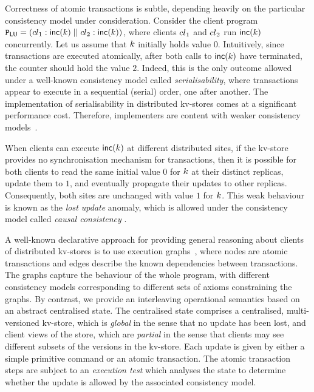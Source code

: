 Correctness of atomic transactions is subtle, depending heavily on the
particular consistency model under consideration.  
Consider the client program
$\mathtt{P}_{\mathsf{LU}} = \left({cl}_1 : \mathsf{inc}(k) \;|| \; {cl}_2:
  \mathsf{inc}(k) \right)$, where clients ${cl}_1$ and ${cl}_2$ run
$\mathsf{inc}(k)$ concurrently.
%
Let us assume that  $k$ initially holds value $0$.
Intuitively, since transactions are executed atomically, after both
calls to $\mathsf{inc}(k)$ have terminated, the counter should hold 
the value $2$.
Indeed, this is the only outcome allowed under 
a well-known
consistency model called  \emph{serialisability}, where transactions
appear to execute in a sequential (serial) order, one after another.
The implementation of  serialisability in distributed kv-stores comes at a
significant performance cost. Therefore, implementers are content with
{weaker} consistency models~\cite{whatdoyouwanttocitehere}. 

When clients can execute $\mathsf{inc}(k)$ at different distributed
sites,
if the kv-store provides no synchronisation mechanism for transactions,
then it is possible for both clients to read the same initial value $0$ for $k$ at their
distinct replicas, update them to $1$, and eventually propagate their updates to other replicas. Consequently, both
sites  are unchanged with value  $1$ for $k$.
This weak behaviour is known as the \emph{lost update} anomaly, which
is  allowed under the consistency model called {\em causal consistency} \cite{cops,wren,redblue}.





A well-known declarative approach for providing general reasoning
about clients of distributed kv-stores is to use  execution 
graphs~\cite{bothsorts}, where nodes are atomic transactions and edges describe the
known dependencies between transactions. The graphs capture the
behaviour of the whole program, with different consistency models
corresponding to different sets of axioms constraining the graphs. By
contrast, we provide an interleaving operational semantics based on an
abstract centralised state. The centralised state comprises a
centralised, multi-versioned kv-store, which is {\em global} in the
sense that no update has been lost, and client views of the store,
which are {\em partial} in the sense that clients may see different 
subsets of the versions in the kv-store. Each update is given by either
a simple primitive command or an atomic transaction. The atomic
transaction steps are subject to an {\em execution test} which
analyses the state to determine whether the update is allowed by 
the associated  consistency model. 



